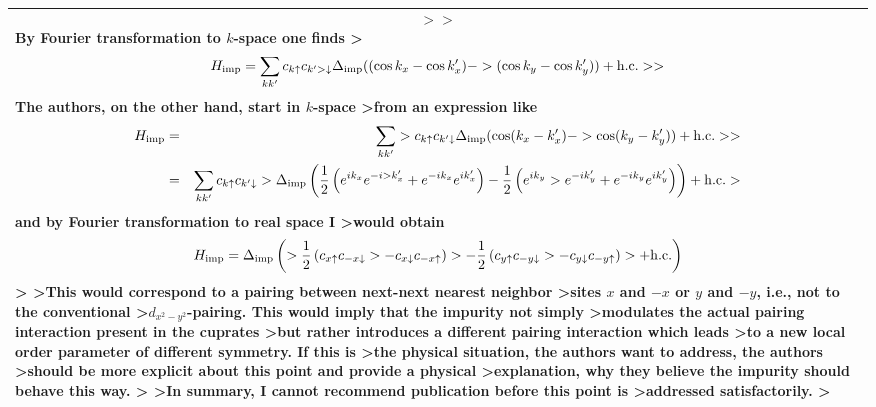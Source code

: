 \documentclass[11pt]{article}
\begin{document}
\begin{longtable}[]{@{}l@{}}
\begin{minipage}[t]{0.96\columnwidth}
\begin{eqnarray}
>
>\end{eqnarray} By Fourier transformation to \(k\)-space one finds
\textgreater{}\begin{eqnarray} H_{\rm imp}=\sum_{kk'} c_{k \uparrow} c_{k'
>\downarrow} \Delta_{\rm imp} (( \cos k_x -\cos k'_x)-
>                 ( \cos k_y -\cos k'_y)) + {\rm h.c.}
>
>\end{eqnarray} The authors, on the other hand, start in \(k\)-space
\textgreater{}from an expression like
\begin{eqnarray} H_{\rm imp}&=&\sum_{kk'}
>c_{k \uparrow} c_{k' \downarrow} \Delta_{\rm imp} ( \cos (k_x -k'_x)-
>                  \cos (k_y -k'_y)) + {\rm h.c.}
>
>\nonumber \\ &=&\sum_{kk'} c_{k \uparrow} c_{k' \downarrow}
>\Delta_{\rm imp} \left( \frac{1}{2} \left(e^{i k_x} e^{-i
>k'_x}+e^{-i k_x} e^{i k'_x} \right) -\frac{1}{2} \left(e^{i k_y}
>e^{-i k'_y}+e^{-i k_y} e^{i k'_y}\right) \right) + {\rm h.c.}
>\end{eqnarray} and by Fourier transformation to real space I
\textgreater{}would obtain
\begin{eqnarray} H_{\rm imp}=\Delta_{\rm imp} \left(
>\frac{1}{2} \left(c_{x \uparrow} c_{-x \downarrow}
>                       - c_{x \downarrow} c_{-x \uparrow} \right)
>     - \frac{1}{2} \left(c_{y \uparrow} c_{-y \downarrow}
>                       - c_{y \downarrow} c_{-y \uparrow} \right)
>+ {\rm h.c.} \right) \end{eqnarray} \textgreater{} \textgreater{}This
would correspond to a pairing between next-next nearest neighbor
\textgreater{}sites \(x\) and \(-x\) or \(y\) and \(-y\), i.e., not to
the conventional \textgreater{}\(d_{x^2-y^2}\)-pairing. This would imply
that the impurity not simply \textgreater{}modulates the actual pairing
interaction present in the cuprates \textgreater{}but rather introduces
a different pairing interaction which leads \textgreater{}to a new local
order parameter of different symmetry. If this is \textgreater{}the
physical situation, the authors want to address, the authors
\textgreater{}should be more explicit about this point and provide a
physical \textgreater{}explanation, why they believe the impurity should
behave this way. \textgreater{} \textgreater{}In summary, I cannot
recommend publication before this point is \textgreater{}addressed
satisfactorily. \textgreater{}\strut
\end{minipage}\tabularnewline
\bottomrule
\end{longtable}
\end{document}
